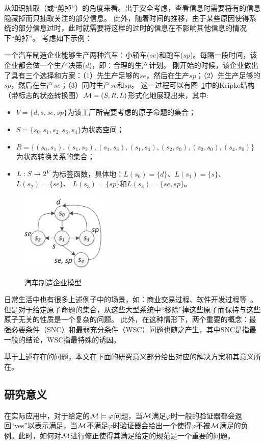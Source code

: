 从知识抽取（或“剪掉”）的角度来看。出于安全考虑，查看信息时需要将有的信息隐藏掉而只抽取关注的部分信息。
此外，随着时间的推移，由于某些原因使得系统的部分信息过时，此时就需要将这样的过时的信息在不影响其他信息的情况下“剪掉”。
考虑如下示例：
\begin{example}[汽车制造企业模型]\label{car_manufacturing}
	一个汽车制造企业能够生产两种汽车：小轿车($se$)和跑车($sp$)。每隔一段时间，该企业都会做一个生产决策($d$)，即：合理的生产计划。
	刚开始的时候，该企业做出了具有三个选择和方案：（1）先生产足够的$se$，然后在生产$sp$；（2）先生产足够的$sp$，然后在生产$se$；（3）同时生产$se$和$sp$。
	这一过程可以有图~\ref{BVM}中的Kripke结构（带标志的状态转换图）${\cal M}=(S,R,L)$形式化地展现出来，其中:
	\begin{itemize}
		\item $V=\{d,s, se, sp\}$为该工厂所需要考虑的原子命题的集合；
		\item $S=\{s_0,s_1,s_2,s_3,s_4\}$为状态空间；
		\item $R = \{(s_0, s_1), (s_1,s_2), (s_1,s_3), (s_1,s_4), (s_2,s_0), (s_3,s_0),(s_4,s_0)\}$为状态转换关系的集合；
		\item $L: S \rightarrow 2^V$为标签函数，具体地：$L(s_0) = \{d\}$、$L(s_1) = \{s\}$、 $L(s_2)=\{se\}$、 $L(s_3) = \{sp\}$和$L(s_4) = \{se,sp\}$。
	\end{itemize}
	\begin{figure}[ht]
		\centering
		\includegraphics[width=4cm]{NnewCar.png}\\
		\caption{汽车制造企业模型}\label{BVM}
	\end{figure}
\end{example}

日常生活中也有很多上述例子中的场景，如：商业交易过程、软件开发过程等~\cite{Baier:PMC:2008}。
但是对于给定原子命题的集合，从这些大型系统中“移除”掉这些原子而保持与这些原子无关的性质是一个复杂的问题。
此外，在这种情形下，两个重要的概念：最强必要条件（SNC）和最弱充分条件（WSC）问题也随之产生，其中SNC是指最一般的结论，WSC指最特殊的诱因。

基于上述存在的问题，本文在下面的研究意义部分给出对应的解决方案和其意义所在。

\subsection{研究意义}
在实际应用中，对于给定的${\cal M}\models \varphi$问题，当${\cal M}$满足$\varphi$时一般的验证器都会返回“yes”以表示满足，当${\cal M}$不满足$\varphi$时验证器会给出一个使得$\varphi$不被${\cal M}$满足的负例。此时，如何对${\cal M}$进行修正使得其满足给定的规范是一个重要的问题。

